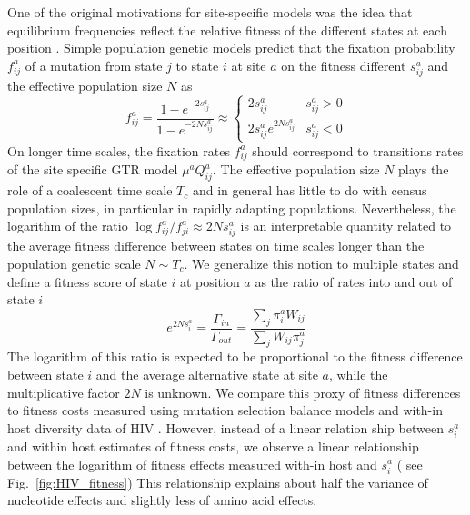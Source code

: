 \documentclass[aps,rmp,twocolumn]{revtex4}
\begin{document}
One of the original motivations for site-specific models was the idea that equilibrium frequencies reflect the relative fitness of the different states at each position \citep{halpern_evolutionary_1998}.
Simple population genetic models predict that the fixation probability $f_{ij}^a$ of a mutation from state $j$ to state $i$ at site $a$ on the fitness different $s^a_{ij}$ and the effective population size $N$ as
\begin{equation}
	f^a_{ij} = \frac{1-e^{-2s^a_{ij}}}{1-e^{-2Ns^a_{ij}}} \approx
	\begin{cases}
		2s^a_{ij} & s^a_{ij}>0 \\
		2s^a_{ij} e^{2Ns^a_{ij}} & s^a_{ij} < 0
	\end{cases}
\end{equation}
On longer time scales, the fixation rates $f^a_{ij}$ should correspond to transitions rates of the site specific GTR model $\mu^a Q^a_{ij}$.
The effective population size $N$ plays the role of a coalescent time scale $T_c$ and in general has little to do with census population sizes, in particular in rapidly adapting populations.
Nevertheless, the logarithm of the ratio $\log f^a_{ij}/f^a_{ji} \approx 2Ns^a_{ij}$ is an interpretable quantity related to the average fitness difference between states on time scales longer than the population genetic scale $N\sim T_c$.
We generalize this notion to multiple states and define a fitness score of state $i$ at position $a$ as the ratio of rates into and out of state $i$
\begin{equation}
	e^{2N s_i^a} = \frac{\Gamma_{in}}{\Gamma_{out}} = \frac{\sum_j \pi_i^a W_{ij}}{\sum_j W_{ij}\pi_j^a}
\end{equation}
The logarithm of this ratio is expected to be proportional to the fitness difference between state $i$ and the average alternative state at site $a$, while the multiplicative factor $2N$ is unknown.
We compare this proxy of fitness differences to fitness costs measured using mutation selection balance models and with-in host diversity data of HIV \citep{zanini2017vivo}.
However, instead of a linear relation ship between $s_i^a$ and within host estimates of fitness costs, we observe a linear relationship between the logarithm of fitness effects measured with-in host and $s_i^a$ (
see Fig.~\ref{fig:HIV_fitness})
This relationship explains about half the variance of nucleotide effects and slightly less of amino acid effects.
\end{document}
